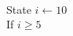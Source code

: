 \documentclass[preview]{standalone}
\begin{document}
\begin{center}
\begin{algorithmic}
            \\State $i \gets 10$ 
            \\If {$i\geq 5$} 
            \end{algorithmic}
\end{center}
\end{document}
